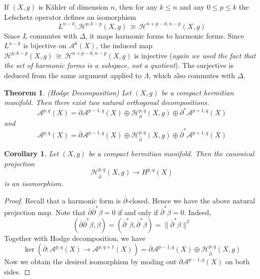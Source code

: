 \documentclass[12pt]{article}
\theoremstyle{plain}
\newtheorem{theorem}[equation]{Theorem}
\newtheorem{corollary}[equation]{Corollary}
\theoremstyle{definition}
\newcommand\iso{\,{\cong}\,}
\newcommand{\<}{\langle}
\renewcommand{\>}{\rangle}
\newcommand{\p}{\partial}
\newcommand{\sH}{\mathcal{H}}
\newcommand{\bp}{\overline{\p}}
\newcommand{\sA}{\mathcal{A}}
\begin{document}
If $(X, g)$ is K{\"a}hler of dimension $n$, then for any $k \le n$ and any $0 \le p \le k$ the Lefschetz operator defines an isomorphism 
$$ L^{n -k} : \sH^{p, k - p} (X, g) \iso \sH^{n + p - k, n - p}(X, g) $$
Since $L$ commutes with $\Delta$, it maps harmonic forms to harmonic forms. Since $L^{n - k}$ is bijective on $\sA^k(X)$, the induced map $\sH^{p, k - p} (X, g) \iso \sH^{n + p - k, n - p}(X, g)$ is injective (\textit{again we used the fact that the set of harmonic forms is a subspace, not a quotient}). The surjective is deduced from the same argument applied to $\Lambda$, which also commutes with $\Delta$. 


\begin{theorem}
\emph{(Hodge Decomposition)}
Let $(X, g)$ be a compact hermitian manifold. Then there exist two natural orthogonal decompositions. 
$$ \sA^{p, q}(X) = \p \sA^{p - 1, q}(X) \oplus \sH_\p^{p, q}(X, g) \oplus \p^* \sA^{p + 1, q}(X) $$
and $$ \sA^{p, q}(X) = \bp \sA^{p - 1, q}(X) \oplus \sH_{\bp}^{p, q}(X, g) \oplus \bp^* \sA^{p + 1, q}(X) $$
\end{theorem}

\begin{corollary}
Let $(X, g)$ be a compact hermitian manifold. Then the canonical projection 
$$ \sH^{p, q}_{\bp} (X, g) \to H^{p, q}(X) $$
is an isomorphism. 
\end{corollary}
\begin{proof}
Recall that a harmonic form is $\bp$-closed. Hence we have the above natural projection map. Note that $\bp \bp^* \beta = 0$ if and only if $\bp^* \beta = 0$. Indeed, 
$$ (\bp \bp^* \beta, \beta) = (\bp^* \beta, \bp^* \beta) = \| \bp^* \beta \|^2 $$
Together with Hodge decomposition, we have 
$$ \ker(\bp : \sA^{p, q}(X) \to \sA^{p, q + 1}(X)) = \bp \sA^{p - 1, q}(X) \oplus \sH_{\bp}^{p, q}(X, g) $$
Now we obtain the desired isomorphism by moding out $\bp \sA^{p - 1, q}(X)$ on both sides. 
\end{proof}
\end{document}

